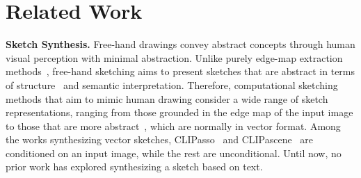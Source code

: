 \documentclass{article}
\begin{document}
\section{Related Work}
\noindent\textbf{Sketch Synthesis.}\quad
Free-hand drawings convey abstract concepts through human visual perception with minimal abstraction. Unlike purely edge-map extraction methods~\cite{canny_1986}, free-hand sketching aims to present sketches that are abstract in terms of structure~\cite{infodrawing_Chan_2022} and semantic interpretation\cite{vinker_2022_clipasso}. Therefore, computational sketching methods that aim to mimic human drawing consider a wide range of sketch representations, ranging from those grounded in the edge map of the input image\cite{xie_2015_holistically,free_li_2017, li2019photo, grayscale_tong_2021,liu2020unsupervised,deepfacedrawing_chen_2020} to those that are more abstract~\cite{sketchRNN_ha_2018a,creative_ge_2021,doodleformer_bhunia_2022, clipdraw_frans_2022, SketchLattice_Qi_2021,vinker_2022_clipasso}, which are normally in vector format. Among the works synthesizing vector sketches, CLIPasso~\cite{vinker_2022_clipasso} and CLIPascene~\cite{clipascene_vinker_2022} are conditioned on an input image, while the rest are unconditional. Until now, no prior work has explored synthesizing a sketch based on text. 
\end{document}
